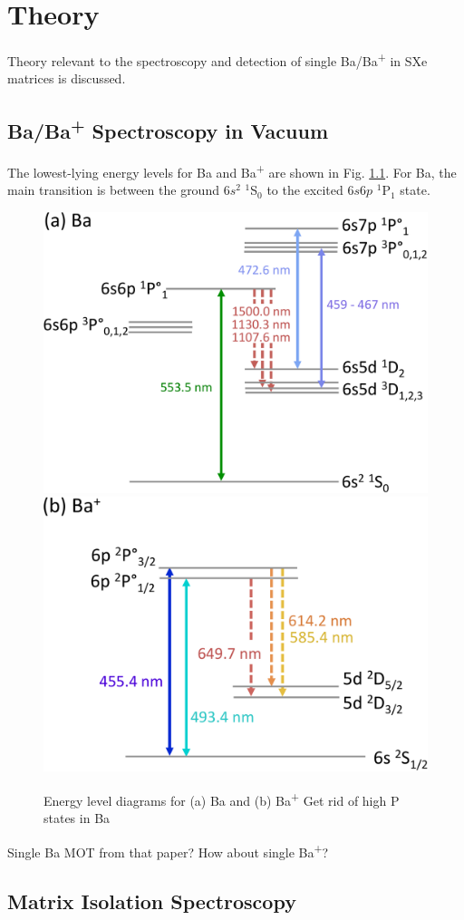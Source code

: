 \chapter{Theory}

Theory relevant to the spectroscopy and detection of single Ba/Ba\textsuperscript{+} in SXe matrices is discussed.  

\section{Ba/Ba\textsuperscript{+} Spectroscopy in Vacuum}

The lowest-lying energy levels for Ba and Ba\textsuperscript{+} are shown in Fig. \ref{fig:elevs}.  For Ba, the main transition is between the ground $6s^{2}$ $^{1}$S$_{0}$ to the excited $6s6p$ $^{1}$P$_{1}$ state.

\begin{figure}[H]
	\includegraphics[width=.35\textwidth]{figures/BaLevs_atom.pdf}
	\includegraphics[width=.35\textwidth]{figures/BaLevs_ion.pdf}
	\caption{Energy level diagrams for (a) Ba and (b) Ba\textsuperscript{+} {\color{red}Get rid of high P states in Ba}}
    \label{fig:elevs}
\end{figure}

Single Ba MOT from that paper?  How about single Ba\textsuperscript{+}?

\section{Matrix Isolation Spectroscopy}


